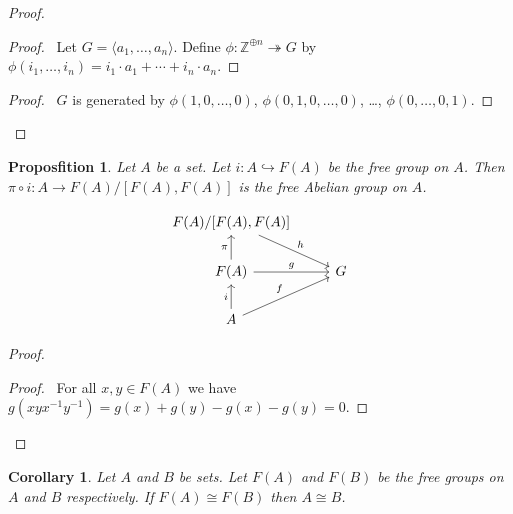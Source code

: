 \documentclass{book}
\let\qed\relax
\newtheorem{prop}{Proposfition}[chapter]
\newtheorem{cor}{Corollary}[prop]
\theoremstyle{definition}
\newcommand{\inv}[1]{\ensuremath{{#1}^{-1}}}
\begin{document}
\begin{proof}
\pf
{}
\begin{proof}
	\pf\ Let $G = \langle a_1, \ldots, a_n \rangle$. Define $\phi : \mathbb{Z}^{\oplus n} \twoheadrightarrow G$ by $\phi(i_1, \ldots, i_n) = i_1 \cdot a_1 + \cdots + i_n \cdot a_n$.
\end{proof}
\begin{proof}
	\pf\ $G$ is generated by $\phi(1, 0, \ldots, 0)$, $\phi(0, 1, 0, \ldots, 0)$, \ldots, $\phi(0, \ldots, 0, 1)$.
\end{proof}
\qed
\end{proof}

\begin{prop}
Let $A$ be a set. Let $i : A \hookrightarrow F(A)$ be the free group on $A$. Then $\pi \circ i : A \rightarrow F(A) / [F(A),F(A)]$ is the free Abelian group on $A$.
\end{prop}

\[ \begin{tikzcd}
F(A)/[F(A),F(A)] \arrow[dr,"h"] \\
F(A) \arrow[r,"g"] \arrow[u,"\pi"] & G \\
A \arrow[u,"i"] \arrow[ur,"f"]
\end{tikzcd} \]

\begin{proof}
\pf
{}
\begin{proof}
	\pf\ For all $x,y \in F(A)$ we have $g(xy\inv{x}\inv{y}) = g(x) + g(y) - g(x) - g(y) = 0$.
\end{proof}
\qed
\end{proof}

\begin{cor}
Let $A$ and $B$ be sets. Let $F(A)$ and $F(B)$ be the free groups on $A$ and $B$ respectively. If $F(A) \cong F(B)$ then $A \cong B$.
\end{cor}
\end{document}
